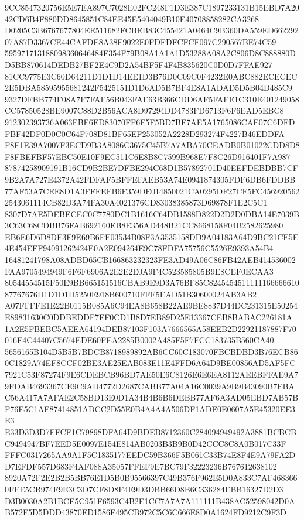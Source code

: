 \documentclass[UTF8,fontset=fandol,zihao=-4,a4paper]{ctexart}
\begin{document}
{{9CC8547320756E5E7EA897C7028E02FC248F1D3E387C1897233131B15EBD7A2042CD6B4F880DD8645851C84EE45E5404049B10E40708858282CA3268
D0205C3B6767677804EE511682FCBEB83C455421A0464C9B360DA559ED66229207A87D3367CE44CAFDE8A38F9022E0FDFDFCFCF097C290567BE74C59
595971713188098360646484F354F79B08A1A1A1D53288A08A2C806D8C888880DD5BB870614DEDB27BF2E4C9D2A54BF5F4F4B835620C0D0D7FFAE927
81CC9775E3C60D64211D1D1D14EE1D3B76D0C09C0F4232E0ABC882ECECEC2E5DBA58595955681242F5425151D1D6AD5B7BF4E8A1ADAD5D5B04D485C9
9327DFBB774F08A7F7FAF56B043FAE63B366CDD6AF5FAFE1C310E401249058CC57850528BE9007C88D2B56ACA8D97294DD4783FD6713F6F6EAD5EBC8
912302393736A063FBF6ED83070FF6F5F5BD7BF7AE5A1765086CAE07C6DFDFBF42DF0D0C0C64F708D81BF65EF253052A2228D293274F4227B46EDDFA
F8F1E39A7007F3ECD9B3A8086C3675C45B7A7ABA70CEADB0B01022CDD8D8F8FBEFBF57EBC50E10F9EC511C6E8B8C7599B968E7F8C26D916401F7A987
87874258909191B16CD9B2BE7DFBE294C68D1B57892701D40EEFDEBDBB7CF9B2A7A727E4372A42FDFAF5BFFEFAEB53A74E0941874305FDF6DB6FDDBB
77AF53A7CEE8D1A3FFFEFB6F359DE014850021CA0295DF27CF5FC4569205622543061114CB82D3A74FA30A4021376CD83038385873D69878F1E2C5C1
8307D7AE5DEBECEC0C7780DC1B1616C64DB1588D822D2D2D0DBA14E7039B3C63C68CDBB76FAB692160EB8E356AD448B21CC8668158F04B2582625980
EB6E6D6D8DF3F9E69B6FE03534B08F3A3535158DD9A04183A64D9BC21CE5E4E454EFF94091262424E0A2E094264E9C78FDFA75756C5526E9393A54B4
16481241798A08ADBD65CB166863232323FE3AD49A06C86FB42AEB414536002FAA9705494949F6F6F6906A2E2E2E0A9F4C523585805B9E8CEF0ECAA3
80544554515F50E9BB665151516CBAB9E9D3A76BF85C824545451111116666661087767676D1D1D1D5250E918B600710FFF5EAD51B30600024AB3AB2
A07FFFFE1E22B0115B085A6C94EA8B658B22AE9BE8837D44DC231315E50254E89831630C0DDBEDDF7FF0CD1B8D7EB89D25E13367CEB8BABAC226181A
1A2E5FBEBC5AEEA64194DEB87103F103A7666565A58EEB2D22921187887F70016F4C44407C5674EDE60FEA2285B0002A485F5F7FCC183735B560CA40
5656165B104D5B5B7BDCB8718989892AB6CC60C183070FBCBDBD3B76ECB860C1829A74EF8CCF02BE3AE25EAB083E11E4FFD6A64D9BE00856AD5AF5FC
7921C53F87274F9E6CDEBCB96BD7AE50E6C8126E6E6EA8112AEEBFFAE9A79FDAB4693367CE9C9AD4772D2687CABB77A04A16C0039A9B9B43090B7FBA
C56A417A7AFAE2C58BD13E0D1A34B4B6B6DEBB77AF6A3AD05EBD7AB57BF76E5C1AF87414851ADCC2D55E0B4A4A4A506DF1ADE0E0607A5E45320EE3E3
E33D3D3D7FFCF1C79898DFA64D9BDEB8712360C284094949492A3881BCBCBC9494947BF7EED5E0097E154E814AB0203B3B9B0D42CCC8C8A0B017C33F
FFFC0317265AA9A1F5C1835177EEDC59B366F5B061C33B74E8F4E9A79FA2DD7EFDF557D683F4AF088A35057FFEF9E7BC79F32223236B767612638102
8920A72F2E2B2B5BB76E1D5B0B95566397C49B376F962E5D0A833C7AF4683660FFE5CB974F9E3C3D7CF8D8F4E9D3DBB66D8B6C336284EBB16327D2D3
D3B0030A2B1BCE5C951F6593C4B2E1CC7A7A7A111111B438AC52598042D0AB572F5D5DDD43870ED1586F495CB972C5C6C666E8D0A1624FD9212C9F3D
}}
\end{document}

